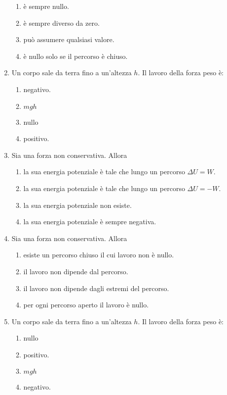 \documentclass{article}
\begin{document}
\begin{enumerate}
  \begin{enumerate}[label=\Alph*.]
    \item è sempre nullo.
    \item è sempre diverso da zero.
    \item può assumere qualsiasi valore.
    \item è nullo solo se il percorso è chiuso.
  \end{enumerate}
  \item Un corpo sale da terra fino a un'altezza $h$. Il lavoro della forza peso è:
  \begin{enumerate}[label=\Alph*.]
    \item negativo.
    \item $mgh$
    \item nullo
    \item positivo.
  \end{enumerate}
  \item Sia  una forza non conservativa. Allora
  \begin{enumerate}[label=\Alph*.]
    \item la sua energia potenziale è tale che lungo un percorso $\Delta U=W$.
    \item la sua energia potenziale è tale che lungo un percorso $\Delta U=-W$.
    \item la sua energia potenziale non esiste.
    \item la sua energia potenziale è sempre negativa.
  \end{enumerate}
  \item Sia  una forza non conservativa. Allora
  \begin{enumerate}[label=\Alph*.]
    \item esiste un percorso chiuso il cui lavoro non è nullo.
    \item il lavoro non dipende dal percorso.
    \item il lavoro non dipende dagli estremi del percorso.
    \item per ogni percorso aperto il lavoro è nullo.
  \end{enumerate}
  \item Un corpo sale da terra fino a un'altezza $h$. Il lavoro della forza peso è:
  \begin{enumerate}[label=\Alph*.]
    \item nullo
    \item positivo.
    \item $mgh$
    \item negativo.

\end{enumerate}
\end{enumerate}
\end{document}
